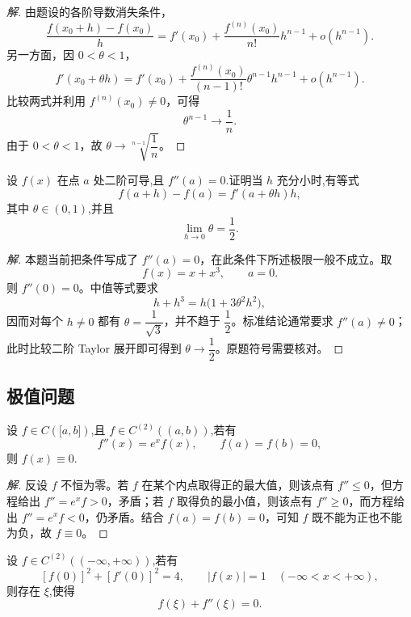 \documentclass[../../数学分析培优讲义(答案版).tex]{subfiles}
\begin{document}
\begin{proof}[解]
由题设的各阶导数消失条件，
\[
    \dfrac{f(x_0+h)-f(x_0)}{h}
    =f'(x_0)+\dfrac{f^{(n)}(x_0)}{n!}h^{n-1}+o(h^{n-1}).
\]
另一方面，因 $0<\theta<1$，
\[
    f'(x_0+\theta h)
    =f'(x_0)+\dfrac{f^{(n)}(x_0)}{(n-1)!}
    \theta^{n-1}h^{n-1}+o(h^{n-1}).
\]
比较两式并利用 $f^{(n)}(x_0)\neq0$，可得
\[
    \theta^{n-1}\longrightarrow\dfrac{1}{n}.
\]
由于 $0<\theta<1$，故 $\theta\to\sqrt[n-1]{\dfrac{1}{n}}$。
\end{proof}

\begin{example}
设 $f(x)$ 在点 $a$ 处二阶可导,且 $f''(a)=0$.证明当 $h$ 充分小时,有等式
\[
    f(a+h)-f(a)=f'(a+\theta h)h,
\]
其中 $\theta\in(0,1)$,并且
\[
    \lim\limits_{h\to0}\theta=\dfrac{1}{2}.
\]
\end{example}

\begin{proof}[解]
本题当前把条件写成了 $f''(a)=0$，在此条件下所述极限一般不成立。取
\[
    f(x)=x+x^3,
    \qquad a=0.
\]
则 $f''(0)=0$。中值等式要求
\[
    h+h^3=h\bigl(1+3\theta^2h^2\bigr),
\]
因而对每个 $h\neq0$ 都有 $\theta=\dfrac{1}{\sqrt3}$，并不趋于 $\dfrac{1}{2}$。标准结论通常要求 $f''(a)\neq0$；此时比较二阶 Taylor 展开即可得到 $\theta\to\dfrac{1}{2}$。原题符号需要核对。
\end{proof}

\subsection{极值问题}

\begin{example}
设 $f\in C(\lbrack a,b\rbrack)$,且 $f\in C^{(2)}((a,b))$,若有
\[
    f''(x)=e^x f(x),\qquad f(a)=f(b)=0,
\]
则 $f(x)\equiv0$.
\end{example}

\begin{proof}[解]
反设 $f$ 不恒为零。若 $f$ 在某个内点取得正的最大值，则该点有 $f''\leq0$，但方程给出 $f''=e^x f>0$，矛盾；若 $f$ 取得负的最小值，则该点有 $f''\geq0$，而方程给出 $f''=e^x f<0$，仍矛盾。结合 $f(a)=f(b)=0$，可知 $f$ 既不能为正也不能为负，故 $f\equiv0$。
\end{proof}

\begin{example}
设 $f\in C^{(2)}((-\infty,+\infty))$,若有
\[
    [f(0)]^2+[f'(0)]^2=4,
    \qquad |f(x)|=1\quad(-\infty<x<+\infty),
\]
则存在 $\xi$,使得
\[
    f(\xi)+f''(\xi)=0.
\]
\end{example}
\end{document}
